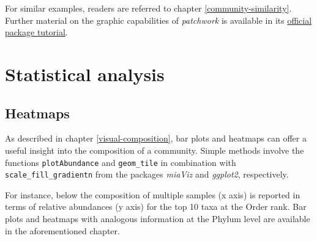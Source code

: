 \documentclass[
]{book}
\begin{document}
For similar examples, readers are referred to chapter
\ref{community-similarity}. Further material on the graphic
capabilities of \emph{patchwork} is available in its \href{https://patchwork.data-imaginist.com/articles/patchwork.html}{official package
tutorial}.

\hypertarget{statistical-analysis}{%
\section{Statistical analysis}\label{statistical-analysis}}

\hypertarget{heatmaps}{%
\subsection{Heatmaps}\label{heatmaps}}

As described in chapter \ref{visual-composition}, bar plots and
heatmaps can offer a useful insight into the composition of a
community. Simple methods involve the functions \texttt{plotAbundance} and
\texttt{geom\_tile} in combination with \texttt{scale\_fill\_gradientn} from the
packages \emph{miaViz} and \emph{ggplot2}, respectively.

For instance, below the composition of multiple samples (x axis) is
reported in terms of relative abundances (y axis) for the top 10 taxa
at the Order rank. Bar plots and heatmaps with analogous information
at the Phylum level are available in the aforementioned chapter.
\end{document}

